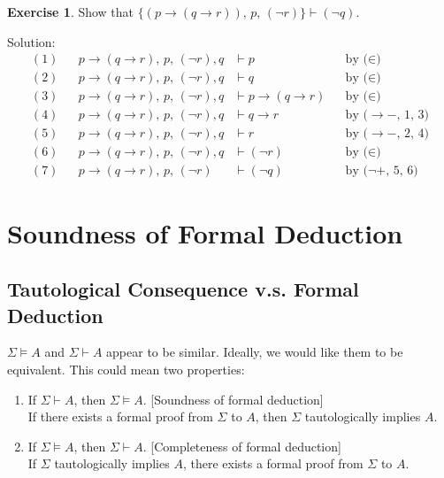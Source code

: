 \documentclass[11pt]{article}
\theoremstyle{definition}
\newtheorem{exercise}[thm]{Exercise}
\begin{document}
\newpage
\begin{exercise}
Show that $\{(p \rightarrow (q \rightarrow r)),\, p,\, (\neg r)\} \vdash (\neg q)$.

Solution:
\begin{align*}
    (1) & & p \rightarrow (q \rightarrow r),\, p,\, (\neg r), q &\vdash p & & \text{by ($\in$)} \\
    (2) & & p \rightarrow (q \rightarrow r),\, p,\, (\neg r), q &\vdash q & & \text{by ($\in$)} \\
    (3) & & p \rightarrow (q \rightarrow r),\, p,\, (\neg r), q &\vdash p \rightarrow (q \rightarrow r) & & \text{by ($\in$)} \\
    (4) & & p \rightarrow (q \rightarrow r),\, p,\, (\neg r), q &\vdash q \rightarrow r & & \text{by ($\rightarrow-$, 1, 3)} \\
    (5) & & p \rightarrow (q \rightarrow r),\, p,\, (\neg r), q &\vdash r & & \text{by ($\rightarrow-$, 2, 4)} \\
    (6) & & p \rightarrow (q \rightarrow r),\, p,\, (\neg r), q &\vdash (\neg r)  & & \text{by ($\in$)} \\
    (7) & & p \rightarrow (q \rightarrow r),\, p,\, (\neg r) &\vdash (\neg q) & & \text{by ($\neg+$, 5, 6)} 
\end{align*}
\end{exercise}

\newpage
\section{Soundness of Formal Deduction}

\subsection{Tautological Consequence v.s. Formal Deduction}
$\Sigma \vDash A$ and $\Sigma \vdash A$ appear to be similar. Ideally, we would like them to be equivalent. This could mean two properties: \vspace{-0.25cm}
\begin{enumerate}
    \item If $\Sigma \vdash A$, then $\Sigma \vDash A$. [Soundness of formal deduction] \\
    If there exists a formal proof from $\Sigma$ to $A$, then $\Sigma$ tautologically implies $A$.
    \item If $\Sigma \vDash A$, then $\Sigma \vdash A$. [Completeness of formal deduction] \\
    If $\Sigma$ tautologically implies $A$, there exists a formal proof from $\Sigma$ to $A$.
\end{enumerate}
\end{document}
